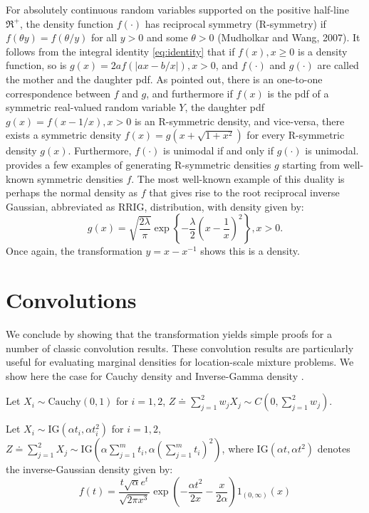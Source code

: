 \documentclass[letterpaper,11pt]{article}
\begin{document}
For absolutely continuous random variables supported on the positive half-line $\Re^{+}$, the density function $f(\cdot)$ has reciprocal symmetry (R-symmetry) if $f(\theta y) = f(\theta / y)$ for all $y > 0$ and some $\theta >0$ (Mudholkar and Wang, 2007). It follows from the integral identity \eqref{eq:identity} that if $f(x), x \geq 0$ is a density function, so is $g(x) = 2a f(|ax-b/x|), x >0$, and $f(\cdot)$ and $g(\cdot)$ are called the mother and the daughter pdf. As \cite{chaubey2010reciprocal} pointed out, there is an one-to-one correspondence between $f$ and $g$, and furthermore if $f(x)$ is the pdf of a symmetric real-valued random variable $Y$, the daughter pdf $g(x) = f(x-1/x), x>0$ is an R-symmetric density, and vice-versa, there exists a symmetric density $f(x) = g(x+\sqrt{1+x^2})$ for every R-symmetric density $g(x)$. Furthermore, $f(\cdot)$ is unimodal if and only if $g(\cdot)$ is unimodal. \cite{chaubey2010reciprocal} provides a few examples of generating R-symmetric densities $g$ starting from well-known symmetric densities $f$. The most well-known example of this duality is perhaps the normal density as $f$ that gives rise to the root reciprocal inverse Gaussian, abbreviated as RRIG, distribution, with density given by: 
$$
g(x) = \sqrt{\frac{2\lambda}{\pi}} \exp \left\{ - \frac{\lambda}{2} \left( x - \frac{1}{x} \right)^2 \right\}, x >0.
$$
Once again, the \CS transformation $y = x - x^{-1}$ shows this is a density. 

\section{Convolutions}
We conclude by showing that the \CS transformation yields simple proofs for a number of classic convolution results. These convolution results are particularly useful for evaluating marginal densities for location-scale mixture problems. We show here the case for Cauchy density \citep{pillai2015unexpected} and Inverse-Gamma density \citep{arnold2009some}. 
\begin{lemma}
Let $X_i \sim \mathrm{Cauchy}(0,1)$ for $i =1,2$, $Z \doteq \sum_{j=1}^{2} w_j X_j  \sim C \left( 0,\sum_{j=1}^{2} w_j \right)$.
\end{lemma}
\begin{lemma}
Let $X_i \sim \mathrm{IG}(\alpha t_i, \alpha t_i^2)$ for $i = 1,2$, $Z \doteq \sum_{j=1}^{2} X_j \sim \mathrm{IG}(\alpha \sum_{j=1}^{m} t_i, \alpha (\sum_{j=1}^{m} t_i)^2)$, where $\mathrm{IG}(\alpha t, \alpha t^2)$ denotes the inverse-Gaussian density given by:
$$
f(t) = \frac{t \sqrt{\alpha} e^t}{\sqrt{2 \pi x^3}} \exp \left( -\frac{\alpha t^2}{2x} - \frac{x}{2\alpha} \right) 1_{(0,\infty)}(x) 
$$
\end{lemma}
\end{document}

